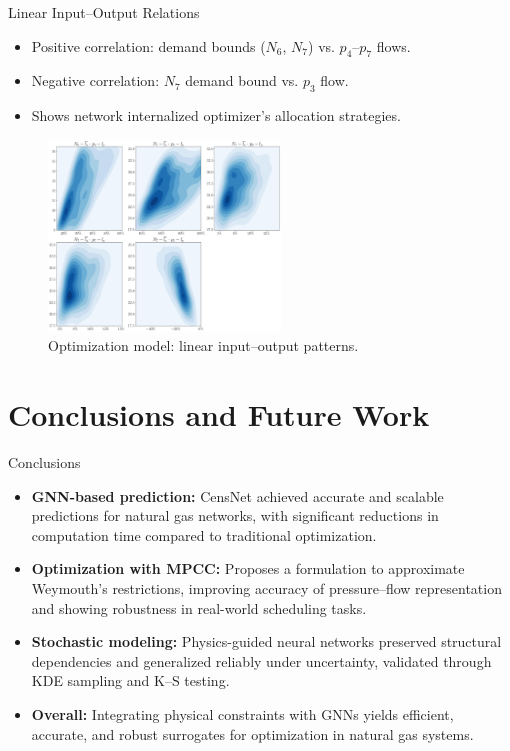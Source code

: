 \documentclass[hyperref={colorlinks,citecolor=blue,linkcolor=blue,urlcolor=blue}]{beamer}
\begin{document}
\begin{frame}{Linear Input--Output Relations}
\scriptsize
    \begin{itemize}
        \item Positive correlation: demand bounds ($N_6$, $N_7$) vs. $p_4$--$p_7$ flows.
        \item Negative correlation: $N_7$ demand bound vs. $p_3$ flow.
        \item Shows network internalized optimizer’s allocation strategies.
    \end{itemize}
    \begin{figure}
        \includegraphics[width=0.55\textwidth]{figures/inputs_outputs_2.png}
        \caption{\scriptsize Optimization model: linear input–output patterns.}
    \end{figure}
\end{frame}

\section{Conclusions and Future Work}
\begin{frame}{Conclusions}
    \begin{itemize}
        \item \textbf{GNN-based prediction:} CensNet achieved accurate and scalable predictions for natural gas networks, with significant reductions in computation time compared to traditional optimization.
        \item \textbf{Optimization with MPCC:} Proposes a formulation to approximate Weymouth's restrictions, improving accuracy of pressure–flow representation and showing robustness in real-world scheduling tasks.
        \item \textbf{Stochastic modeling:} Physics-guided neural networks preserved structural dependencies and generalized reliably under uncertainty, validated through KDE sampling and K–S testing.
        \item \textbf{Overall:} Integrating physical constraints with GNNs yields efficient, accurate, and robust surrogates for optimization in natural gas systems.
    \end{itemize}
\end{frame}
\end{document}
